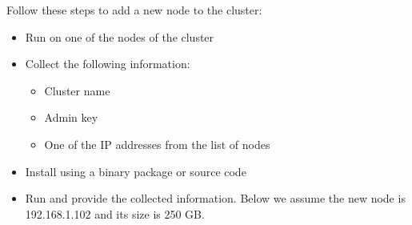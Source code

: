 Follow these steps to add a new node to the cluster:
\begin{itemize}
    \item Run  on one of the nodes of the cluster
    \item Collect the following information:
	\begin{itemize}
	    \item Cluster name
	    \item Admin key
	    \item One of the IP addresses from the list of nodes
	\end{itemize}
    \item Install \SX using a binary package or source code
    \item Run  and provide the collected information.
	  Below we assume the new node is 192.168.1.102 and its size is 250 GB.
\end{itemize}

